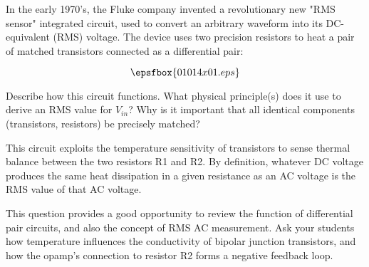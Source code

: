

In the early 1970's, the Fluke company invented a revolutionary new "RMS sensor" integrated circuit, used to convert an arbitrary waveform into its DC-equivalent (RMS) voltage.  The device uses two precision resistors to heat a pair of matched transistors connected as a differential pair:

$$\epsfbox{01014x01.eps}$$

Describe how this circuit functions.  What physical principle(s) does it use to derive an RMS value for $V_{in}$?  Why is it important that all identical components (transistors, resistors) be precisely matched?







This circuit exploits the temperature sensitivity of transistors to sense thermal balance between the two resistors R1 and R2.  By definition, whatever DC voltage produces the same heat dissipation in a given resistance as an AC voltage is the RMS value of that AC voltage.







This question provides a good opportunity to review the function of differential pair circuits, and also the concept of RMS AC measurement.  Ask your students how temperature influences the conductivity of bipolar junction transistors, and how the opamp's connection to resistor R2 forms a negative feedback loop.




